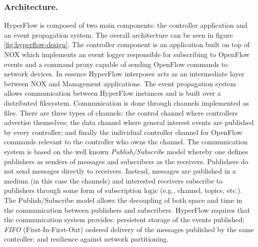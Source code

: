 \subsubsection{Architecture.} HyperFlow is composed of two main components: the controller application
and an event propagation system. The overall architecture can be seen
in figure \ref{fig:hyperflow-design}. The controller component is
an application built on top of NOX \cite{Gude:2008jd} which implements an event logger
responsible for subscribing to OpenFlow events and a command proxy
capable of sending OpenFlow commands to  network devices. In essence
HyperFlow interposes acts as an intermediate layer between NOX and
Management applications. The event
propagation system allows  communication between HyperFlow
instances and  is built over a distributed filesystem. Communication
is done through channels implemented as files. There are three types of channels: the
control channel where controllers advertise themselves; the data
channel where general interest events are published by every
controller;  and finally the individual controller channel for OpenFlow
commands relevant to the controller who owns the channel. The
communication system is based on the well known \emph{Publish/Subscribe}
model  whereby one defines publishers as senders of
messages and subscribers as the receivers. Publishers do not send
messages directly  to receivers.  Instead,
messages are published in a medium (in this case the channels) and
interested receivers subscribe to publishers through some form of
subscription logic (e.g., channel, topics, etc.). The Publish/Subscribe
model allows the decoupling of both space and time in the
communication between publishers and subscribers. 
HyperFlow requires that the communication system  provides:
persistent storage of the events published; \emph{FIFO}
(First-In-First-Out)  ordered delivery of
the messages published by the same controller; and resilience against
network partitioning.

